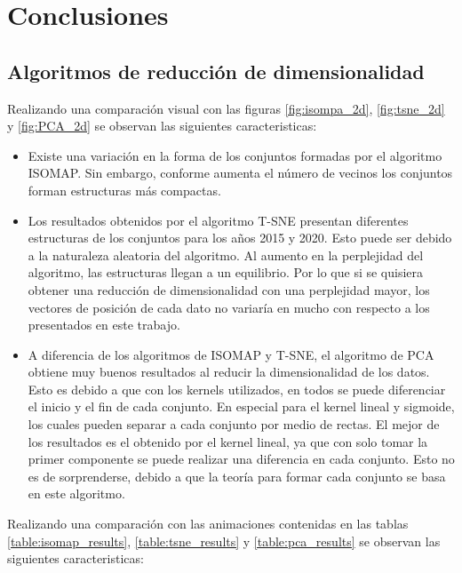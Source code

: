 \section{Conclusiones}

\subsection{Algoritmos de reducción de dimensionalidad}

Realizando una comparación visual con las figuras \ref{fig:isompa_2d}, \ref{fig:tsne_2d} y \ref{fig:PCA_2d} se observan las siguientes caracteristicas:

\begin{itemize}
    \item Existe una variación en la forma de los conjuntos formadas por el algoritmo ISOMAP. Sin embargo, conforme aumenta el número de vecinos los conjuntos forman estructuras más compactas.
    \item Los resultados obtenidos por el algoritmo T-SNE presentan diferentes estructuras de los conjuntos para los años 2015 y 2020. Esto puede ser debido a la naturaleza aleatoria del algoritmo. Al aumento en la perplejidad del algoritmo, las estructuras llegan a un equilibrio. Por lo que si se quisiera obtener una reducción de dimensionalidad con una perplejidad mayor, los vectores de posición de cada dato no variaría en mucho con respecto a los presentados en este trabajo.
    \item A diferencia de los algoritmos de ISOMAP y T-SNE, el algoritmo de PCA obtiene muy buenos resultados al reducir la dimensionalidad de los datos. Esto es debido a que con los kernels utilizados, en todos se puede diferenciar el inicio y el fin de cada conjunto. En especial para el kernel lineal y sigmoide, los cuales pueden separar a cada conjunto por medio de rectas. El mejor de los resultados es el obtenido por el kernel lineal, ya que con solo tomar la primer componente se puede realizar una diferencia en cada conjunto. Esto no es de sorprenderse, debido a que la teoría para formar cada conjunto se basa en este algoritmo.
\end{itemize}

Realizando una comparación con las animaciones contenidas en las tablas \ref{table:isomap_results}, \ref{table:tsne_results} y \ref{table:pca_results} se observan las siguientes caracteristicas:

